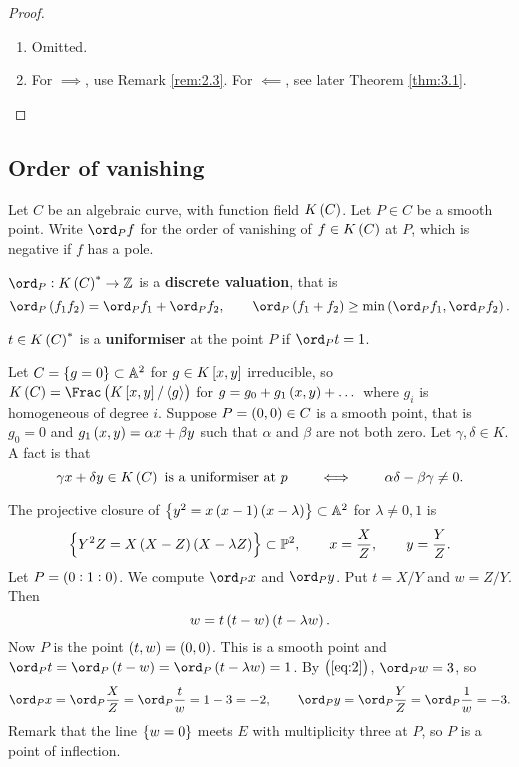 \begin{proof}
\hfill
\begin{enumerate}
\item Omitted.
\item For $ \implies $, use Remark \ref{rem:2.3}. For $ \impliedby $, see later Theorem \ref{thm:3.1}.
\end{enumerate}
\end{proof}

\subsection{Order of vanishing}

Let $ C $ be an algebraic curve, with function field $ K\br{C} $. Let $ P \in C $ be a smooth point. Write $ \ord_P f $ for the order of vanishing of $ f \in K\br{C} $ at $ P $, which is negative if $ f $ has a pole.

\begin{fact*}
$ \ord_P : K\br{C}^* \to \ZZ $ is a \textbf{discrete valuation}, that is
$$ \ord_P \br{f_1f_2} = \ord_P f_1 + \ord_P f_2, \qquad \ord_P \br{f_1 + f_2} \ge \min\br{\ord_P f_1, \ord_P f_2}. $$
\end{fact*}

\begin{definition*}
$ t \in K\br{C}^* $ is a \textbf{uniformiser} at the point $ P $ if $ \ord_P t = 1 $.
\end{definition*}

\pagebreak

\begin{example}
Let $ C = \cbr{g = 0} \subset \AA^2 $ for $ g \in K\sbr{x, y} $ irreducible, so $ K\br{C} = \Frac \br{K\sbr{x, y} / \abr{g}} $ for $ g = g_0 + g_1\br{x, y} + \dots $ where $ g_i $ is homogeneous of degree $ i $. Suppose $ P = \br{0, 0} \in C $ is a smooth point, that is $ g_0 = 0 $ and $ g_1\br{x, y} = \alpha x + \beta y $ such that $ \alpha $ and $ \beta $ are not both zero. Let $ \gamma, \delta \in K $. A fact is that
$$ \gamma x + \delta y \in K\br{C} \ \text{is a uniformiser at} \ p \qquad \iff \qquad \alpha\delta - \beta\gamma \ne 0. $$
\end{example}

\begin{example}
\label{eg:2.6}
The projective closure of $ \cbr{y^2 = x\br{x - 1}\br{x - \lambda}} \subset \AA^2 $ for $ \lambda \ne 0, 1 $ is
$$ \cbr{Y^2Z = X\br{X - Z}\br{X - \lambda Z}} \subset \PP^2, \qquad x = \dfrac{X}{Z}, \qquad y = \dfrac{Y}{Z}. $$
Let $ P = \br{0 : 1 : 0} $. We compute $ \ord_P x $ and $ \ord_P y $. Put $ t = X / Y $ and $ w = Z / Y $. Then
\begin{equation}
\label{eq:2}
w = t\br{t - w}\br{t - \lambda w}.
\end{equation}
Now $ P $ is the point $ \br{t, w} = \br{0, 0} $. This is a smooth point and $ \ord_P t = \ord_P \br{t - w} = \ord_P \br{t - \lambda w} = 1 $. By $ \br{\ref{eq:2}} $, $ \ord_P w = 3 $, so
$$ \ord_P x = \ord_P \dfrac{X}{Z} = \ord_P \dfrac{t}{w} = 1 - 3 = -2, \qquad \ord_P y = \ord_P \dfrac{Y}{Z} = \ord_P \dfrac{1}{w} = -3. $$
Remark that the line $ \cbr{w = 0} $ meets $ E $ with multiplicity three at $ P $, so $ P $ is a point of inflection.
\end{example}

